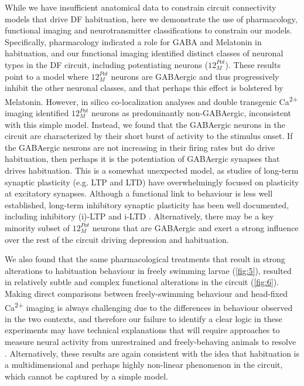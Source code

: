 \documentclass[9pt,lineno]{RandlettLab_elife}
\begin{document}
While we have insufficient anatomical data to constrain circuit connectivity models that drive DF habituation, here we demonstrate the  use of pharmacology, functional imaging and neurotransmitter classifications to constrain our models.  Specifically, pharmacology indicated a role for GABA and Melatonin in habituation, and our functional imaging identified distinct classes of neuronal types in the DF circuit, including potentiating neurons ($12_{M}^{Pot}$). These results point to a model where $12_{M}^{Pot}$ neurons are GABAergic and thus progressively inhibit the other neuronal classes, and that perhaps this effect is bolstered by Melatonin. However, in silico co-localization analyses and double transgenic Ca\textsuperscript{2+} imaging identified $12_{M}^{Pot}$ neurons as predominantly non-GABAergic, inconsistent with this simple model. Instead, we found that the GABAergic neurons in the circuit are characterized by their short burst of activity to the stimulus onset. If the GABAergic neurons are not increasing in their firing rates but do drive habituation, then perhaps it is the potentiation of GABAergic synapses that drives habituation. This is a somewhat unexpected model, as studies of long-term synaptic plasticity (e.g. LTP and LTD) have overwhelmingly focused on plasticity at excitatory synapses. Although a functional link to behaviour is less well established, long-term inhibitory synaptic plasticity has been well documented, including inhibitory (i)-LTP  and i-LTD \citep{Castillo2011-tq}. Alternatively, there may be a key minority subset of $12_{M}^{Pot}$ neurons that are GABAergic and exert a strong influence over the rest of the circuit driving depression and habituation. 

We also found that the same pharmacological treatments that result in strong alterations to habituation behaviour in freely swimming larvae (\autoref{fig:5}), resulted in relatively subtle and complex functional alterations in the circuit (\autoref{fig:6}). Making direct comparisons between freely-swimming behaviour and head-fixed Ca\textsuperscript{2+} imaging is always challenging due to the differences in behaviour observed in the two contexts, and therefore our failure to identify a clear logic in these experiments may have technical explanations that will require approaches to measure neural activity from unrestrained and freely-behaving animals to resolve \citep{Kim2017-oa}. Alternatively, these results are again consistent with the idea that habituation is a multidimensional and perhaps highly non-linear phenomenon in the circuit, which cannot be captured by a simple model.  
\end{document}
